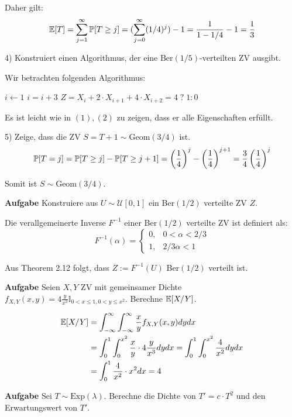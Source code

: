 Daher gilt:
$$\mathbb{E}[T] = \sum_{j=1}^\infty \mathbb{P}[T \geq j] = (\sum_{j=0}^\infty (1/4)^j) - 1 = \frac{1}{1 - 1/4} -1 = \frac{1}{3}$$

4) Konstruiert einen Algorithmus, der eine $\text{Ber}(1/5)$-verteilten ZV ausgibt.

Wir betrachten folgenden Algorithmus:
\begin{algorithmic}
	\State $i \gets 1$
		\State $i = i + 3$
	\EndWhile
	\State \Return $Z = X_i + 2 \cdot X_{i+1} + 4 \cdot X_{i+2} = 4 \; ? \; 1 : 0$
\end{algorithmic}
Es ist leicht wie in $(1), (2)$ zu zeigen, dass er alle Eigenschaften erfüllt. \smallskip

5) Zeige, dass die ZV $S = T + 1 \sim \text{Geom}(3/4)$ ist.
$$\mathbb{P}[T = j] = \mathbb{P}[T \geq j] - \mathbb{P}[T \geq j + 1] = \left( \frac{1}{4} \right)^j - \left( \frac{1}{4} \right)^{j+1} = \frac{3}{4} \left( \frac{1}{4} \right)^j$$ 

Somit ist $S \sim \text{Geom}(3/4)$. \smallskip



\hrulefill

\textbf{Aufgabe}
Konstruiere aus $U \sim \mathcal U[0,1]$ ein Ber$(1/2)$ verteilte ZV $Z$. \smallskip

Die verallgemeinerte Inverse $F^{-1}$ einer Ber$(1/2)$ verteilte ZV ist definiert als:
$$F^{-1}(\alpha) = \begin{cases}
	0, & 0 < \alpha < 2/3 \\
	1, & 2/3 \alpha < 1
\end{cases}$$

Aus Theorem 2.12 folgt, dass $Z:=F^{-1}(U)$ Ber$(1/2)$ verteilt ist.

\hrulefill

\textbf{Aufgabe}
Seien $X,Y$ ZV mit gemeinsamer Dichte $f_{X,Y}(x,y) = 4 \frac{y}{x^3} \mathbb{I}_{0 < x \leq 1, 0 < y \leq x^2}$. Berechne $\mathbb{E}[X / Y]$. \medskip

\begin{align*}
	\mathbb{E}[X / Y] &= \int_{- \infty}^\infty \int_{- \infty}^\infty \frac{x}{y} f_{X,Y}(x,y) dy dx \\
	&= \int_0^1 \int_0^{x^2} \frac{x}{y} \cdot 4 \frac{y}{x^3} dydx = \int_0^1 \int_0^{x^2}\frac{4}{x^2} dydx \\
	&= \int_0^1 \frac{4}{x^2} \cdot x^2 dx = 4
\end{align*}

\hrulefill

\textbf{Aufgabe}
Sei $T \sim \text{Exp}(\lambda)$. Berechne die Dichte von $T' = c \cdot T^2$ und den Erwartungswert von $T'$. \medskip

